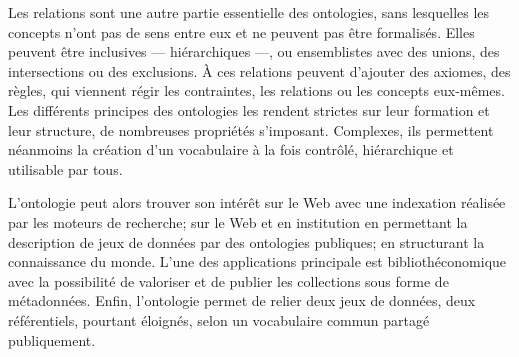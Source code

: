 Les relations sont une autre partie essentielle des ontologies, sans lesquelles les concepts n'ont pas de sens entre eux et ne peuvent pas être formalisés. Elles peuvent être inclusives --- hiérarchiques ---, ou ensemblistes avec des unions, des intersections ou des exclusions. À ces relations peuvent d'ajouter des axiomes, des règles, qui viennent régir les contraintes, les relations ou les concepts eux-mêmes.\\

Les différents principes des ontologies les rendent strictes sur leur formation et leur structure, de nombreuses propriétés s'imposant. Complexes, ils permettent néanmoins la création d'un vocabulaire à la fois contrôlé, hiérarchique et utilisable par tous.

\bigskip
\bigskip
L'ontologie peut alors trouver son intérêt sur le Web avec une indexation réalisée par les moteurs de recherche; sur le Web et en institution en permettant la description de jeux de données par des ontologies publiques; en structurant la connaissance du monde. L'une des applications principale est bibliothéconomique avec la possibilité de valoriser et de publier les collections sous forme de métadonnées. Enfin, l'ontologie permet de relier deux jeux de données, deux référentiels, pourtant éloignés, selon un vocabulaire commun partagé publiquement.